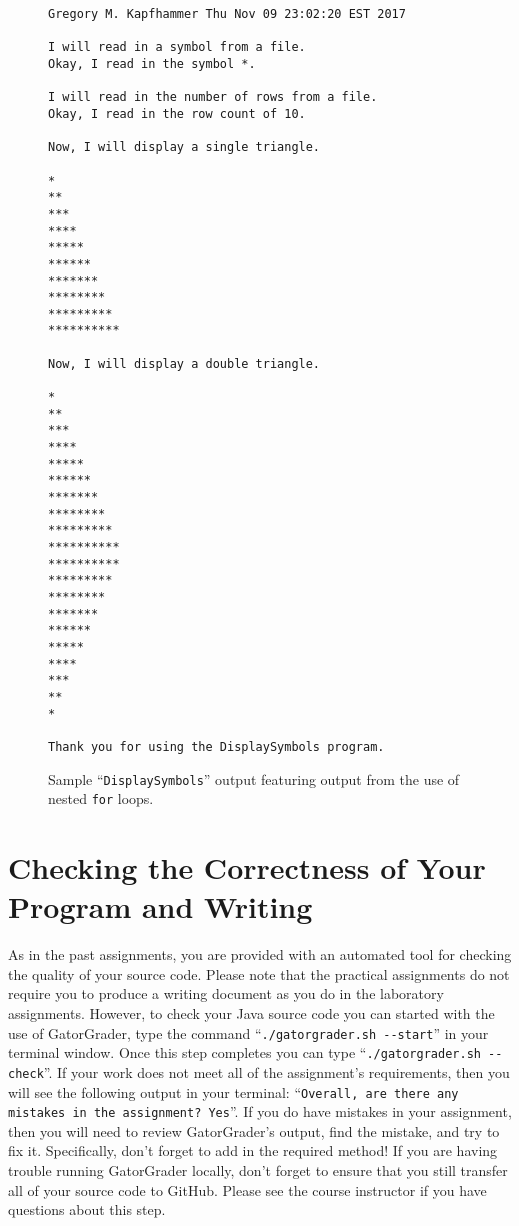 \documentclass[11pt]{article}
\newcommand{\gatorgraderstart}{\command{./gatorgrader.sh --start}}
\newcommand{\gatorgradercheck}{\command{./gatorgrader.sh --check}}
\newcommand{\command}[1]{``\lstinline{#1}''}
\newcommand{\program}[1]{\lstinline{#1}}
\begin{document}
\begin{figure}[tb]
\begin{Verbatim}[commandchars=\\\{\}]
Gregory M. Kapfhammer Thu Nov 09 23:02:20 EST 2017

I will read in a symbol from a file.
Okay, I read in the symbol *.

I will read in the number of rows from a file.
Okay, I read in the row count of 10.

Now, I will display a single triangle.

*
**
***
****
*****
******
*******
********
*********
**********

Now, I will display a double triangle.

*
**
***
****
*****
******
*******
********
*********
**********
**********
*********
********
*******
******
*****
****
***
**
*

Thank you for using the DisplaySymbols program.

\end{Verbatim}
\vspace*{-.1in}
\caption{Sample ``{\tt DisplaySymbols}'' output featuring output from the use of nested \program{for} loops.}
\label{mad}
\end{figure}

\section*{Checking the Correctness of Your Program and Writing}

As in the past assignments, you are provided with an automated tool for checking the quality of your source code. Please
note that the practical assignments do not require you to produce a writing document as you do in the laboratory
assignments. However, to check your Java source code you can started with the use of GatorGrader, type the command
\gatorgraderstart{} in your terminal window. Once this step completes you can type \gatorgradercheck{}. If your work
does not meet all of the assignment's requirements, then you will see the following output in your terminal:
\command{Overall, are there any mistakes in the assignment? Yes}. If you do have mistakes in your assignment, then you
will need to review GatorGrader's output, find the mistake, and try to fix it. Specifically, don't forget to add in the
required method! If you are having trouble running GatorGrader locally, don't forget to ensure that you still transfer
all of your source code to GitHub. Please see the course instructor if you have questions about this step.
\end{document}

